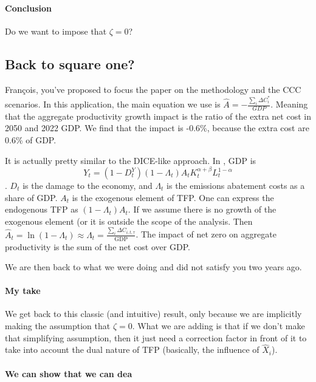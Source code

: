 \documentclass[11pt]{article}
\begin{document}
\paragraph{Conclusion} Do we want to impose that $\zeta=0$?


\subsection{Back to square one?}

François, you've proposed to focus the paper on the methodology and the CCC scenarios. In this application, the main equation we use is $\hat{A}  = -\frac{\sum_i \Delta C^*_i}{GDP}$. Meaning that the aggregate productivity growth impact is the ratio of the extra net cost in 2050 and 2022 GDP. We find that the impact is -0.6\%, because the extra cost are 0.6\% of GDP.

It is actually pretty similar to the DICE-like approach. In \cite{dietzEndogenousGrowthConvexity2015}, GDP is 
\[
Y_t=(1-D_t^Y)(1-\Lambda_t)A_tK^{\alpha+\beta}_tL^{1-\alpha}_t
\]. $D_t$ is the damage to the economy, and $\Lambda_t$ is the emissions abatement costs as a share of GDP. $A_t$ is the exogenous element of TFP. One can express the endogenous TFP as $(1-\Lambda_t)A_t$. If we assume there is no growth of the exogenous element (or it is outside the scope of the analysis. Then $\hat{A}_t=\ln(1-\Lambda_t)\approx \Lambda_t= \frac{\sum_i \Delta C_{i,t,\tau}}{\text{GDP}}$. The impact of net zero on aggregate productivity is the sum of the net cost over GDP.

We are then back to what we were doing and did not satisfy you two years ago.

\paragraph{My take} We get back to this classic (and intuitive) result, only because we are implicitly making the assumption that $\zeta=0$. What we are adding is that if we don't make that simplifying assumption, then it just need a correction factor in front of it to take into account the dual nature of TFP (basically, the influence of $\hat{X}_i$).



\paragraph{We can show that we can dea}
\end{document}
